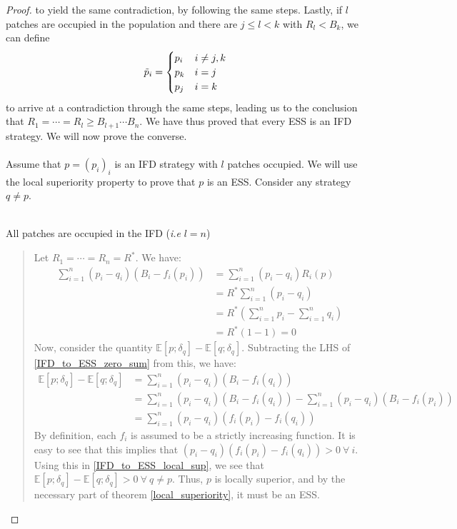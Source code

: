 \begin{proof}
	to yield the same contradiction, by following the same steps. Lastly, if $l$ patches are occupied in the population and there are $j \leq l < k$ with $R_l < B_k$, we can define
	\begin{equation*}
		\Tilde{p}_i = \begin{cases}
			p_i & i \neq j,k \\
			p_k & i = j\\
			p_j & i = k
		\end{cases}
	\end{equation*}
	to arrive at a contradiction through the same steps, leading us to the conclusion that $R_1 = \cdots = R_l \geq B_{l+1} \cdots B_n$. We have thus proved that every ESS is an IFD strategy. We will now prove the converse.\\
	\\
	Assume that $p=(p_i)_i$ is an IFD strategy with $l$ patches occupied. We will use the local superiority property to prove that $p$ is an ESS. Consider any strategy $q \neq p$.
	\\
	\\
	\begin{mycase}
		\case All patches are occupied in the IFD (\textit{i.e} $l = n$)
		\begin{quote}
			Let $R_1=\cdots=R_n=R^*$. We have:
			\begin{align}
				\sum\limits_{i=1}^{n}(p_i-q_i)(B_i-f_i(p_i)) &= \sum\limits_{i=1}^{n}(p_i-q_i)R_i(p)\\
				&= R^*\sum\limits_{i=1}^{n}(p_i-q_i)\nonumber\\
				&= R^*(\sum\limits_{i=1}^{n}p_i-\sum\limits_{i=1}^{n}q_i)\nonumber\\
				&= R^*(1-1) = 0\label{IFD_to_ESS_zero_sum}
			\end{align}
			Now, consider the quantity $\mathbb{E}[p;\delta_q]-\mathbb{E}[q;\delta_q]$. Subtracting the LHS of \eqref{IFD_to_ESS_zero_sum} from this, we have:
			\begin{align}
				\mathbb{E}[p;\delta_q]-\mathbb{E}[q;\delta_q] &= \sum\limits_{i=1}^{n}(p_i-q_i)(B_i-f_i(q_i))\nonumber\\
				&= \sum\limits_{i=1}^{n}(p_i-q_i)(B_i-f_i(q_i))- \sum\limits_{i=1}^{n}(p_i-q_i)(B_i-f_i(p_i))\nonumber\\
				&= \sum\limits_{i=1}^{n}(p_i-q_i)(f_i(p_i)-f_i(q_i))\label{IFD_to_ESS_local_sup}
			\end{align}
			By definition, each $f_i$ is assumed to be a strictly increasing function. It is easy to see that this implies that $(p_i-q_i)(f_i(p_i)-f_i(q_i))>0 \ \forall \ i$. Using this in \eqref{IFD_to_ESS_local_sup}, we see that $\mathbb{E}[p;\delta_q]-\mathbb{E}[q;\delta_q] > 0 \ \forall \ q \neq p$. Thus, $p$ is locally superior, and by the necessary part of theorem \ref{local_superiority}, it must be an ESS.

\end{quote}
\end{mycase}
\end{proof}
